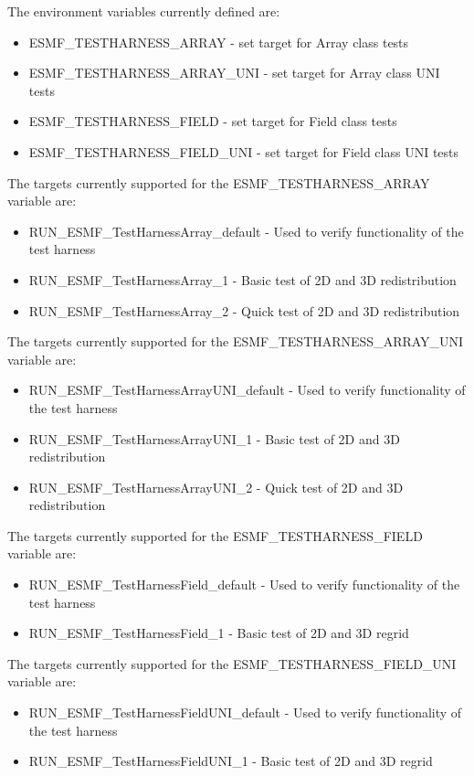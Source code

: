 The environment variables currently defined are:
\begin{itemize}
\item ESMF\_TESTHARNESS\_ARRAY - set target for Array class tests
\item ESMF\_TESTHARNESS\_ARRAY\_UNI - set target for Array class UNI tests
\item ESMF\_TESTHARNESS\_FIELD - set target for Field class tests
\item ESMF\_TESTHARNESS\_FIELD\_UNI - set target for Field class UNI tests
\end{itemize}

The targets currently supported for the ESMF\_TESTHARNESS\_ARRAY variable are:
\begin{itemize}
\item RUN\_ESMF\_TestHarnessArray\_default - Used to verify functionality of the test harness
\item RUN\_ESMF\_TestHarnessArray\_1 - Basic test of 2D and 3D redistribution
\item RUN\_ESMF\_TestHarnessArray\_2 - Quick test of 2D and 3D redistribution
\end{itemize}

The targets currently supported for the ESMF\_TESTHARNESS\_ARRAY\_UNI variable are:
\begin{itemize}
\item RUN\_ESMF\_TestHarnessArrayUNI\_default - Used to verify functionality of the test harness
\item RUN\_ESMF\_TestHarnessArrayUNI\_1 - Basic test of 2D and 3D redistribution
\item RUN\_ESMF\_TestHarnessArrayUNI\_2 - Quick test of 2D and 3D redistribution
\end{itemize}

The targets currently supported for the ESMF\_TESTHARNESS\_FIELD variable are:
\begin{itemize}
\item RUN\_ESMF\_TestHarnessField\_default - Used to verify functionality of the test harness
\item RUN\_ESMF\_TestHarnessField\_1 - Basic test of 2D and 3D regrid
\end{itemize}

The targets currently supported for the ESMF\_TESTHARNESS\_FIELD\_UNI variable are:
\begin{itemize}
\item RUN\_ESMF\_TestHarnessFieldUNI\_default - Used to verify functionality of the test harness
\item RUN\_ESMF\_TestHarnessFieldUNI\_1 - Basic test of 2D and 3D regrid
\end{itemize}

